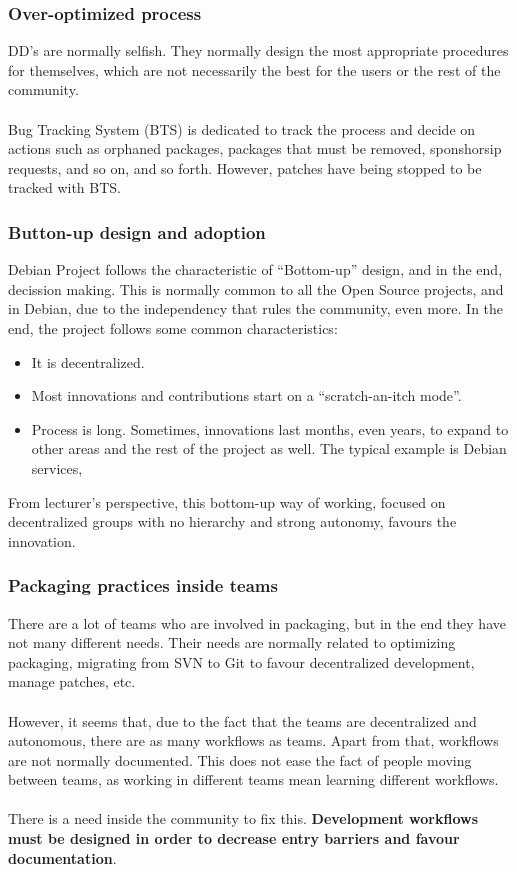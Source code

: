 \documentclass[11pt]{article}
\begin{document}
\subsubsection{Over-optimized process}
DD's are normally selfish. They normally design the most appropriate procedures for themselves, which are not necessarily the best for the users or the rest of the community.\\
\\
Bug Tracking System (BTS) is dedicated to track the process and decide on actions such as orphaned packages, packages that must be removed, sponshorsip requests, and so on, and so forth. However, patches have being stopped to be tracked with BTS.

\subsubsection{Button-up design and adoption}
Debian Project follows the characteristic of ``Bottom-up'' design, and in the end, decission making. This is normally common to all the Open Source projects, and in Debian, due to the independency that rules the community, even more. In the end, the project follows some common characteristics:
\begin{itemize}\itemsep0pt
\item{It is decentralized.}
\item{Most innovations and contributions start on a ``scratch-an-itch mode''.}
\item{Process is long.} Sometimes, innovations last months, even years, to expand to other areas and the rest of the project as well. The typical example is Debian services, 
\end{itemize}
From lecturer's perspective, this bottom-up way of working, focused on decentralized groups with no hierarchy and strong autonomy, favours the innovation.

\subsubsection{Packaging practices inside teams}
There are a lot of teams who are involved in packaging, but in the end they have not many different needs. Their needs are normally related to optimizing packaging, migrating from SVN to Git to favour decentralized development, manage patches, etc.\\
\\
However, it seems that, due to the fact that the teams are decentralized and autonomous, there are as many workflows as teams. Apart from that, workflows are not normally documented. This does not ease the fact of people moving between teams, as working in different teams mean learning different workflows.\\
\\
There is a need inside the community to fix this. \textbf{Development workflows must be designed in order to decrease entry barriers and favour documentation}.
\end{document}
